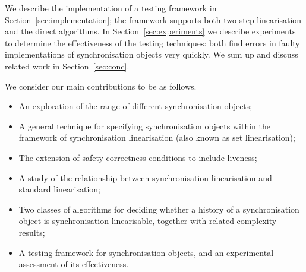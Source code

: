 
We describe the implementation of a testing framework in
Section~\ref{sec:implementation}; the framework supports both two-step
linearisation and the direct algorithms.  In Section~\ref{sec:experiments} we
describe experiments to determine the effectiveness of the testing techniques:
both find errors in faulty implementations of synchronisation objects very
quickly.  We sum up and discuss related work in Section~\ref{sec:conc}.

We consider our main contributions to be as follows.
%
\begin{itemize}
\item An exploration of the range of different synchronisation objects;

\item A general technique for specifying synchronisation objects within the
  framework of synchronisation linearisation (also known as set
  linearisation);

\item The extension of safety correctness conditions to include liveness;

\item A study of the relationship between synchronisation linearisation and
  standard linearisation;

\item Two classes of algorithms for deciding whether a history of a
  synchronisation object is synchronisation-linearisable, together with
  related complexity results;

\item A testing framework for synchronisation objects, and an experimental
  assessment of its effectiveness.
\end{itemize}

